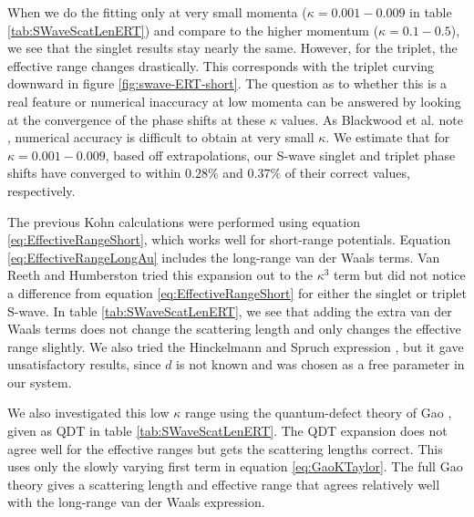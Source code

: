 \documentclass[preprint,showpacs,preprintnumbers,amsmath,amssymb]{revtex4}
\begin{document}
When we do the fitting only at very small momenta ($\kappa = 0.001 - 0.009$ in table \ref{tab:SWaveScatLenERT}) and compare to the higher momentum ($\kappa = 0.1 - 0.5$), we see that the singlet results stay nearly the same. However, for the triplet, the effective range changes drastically. This corresponds with the triplet curving downward in figure \ref{fig:swave-ERT-short}. The question as to whether this is a real feature or numerical inaccuracy at low momenta can be answered by looking at the convergence of the phase shifts at these $\kappa$ values. As Blackwood et al. note \cite{Blackwood2002}, numerical accuracy is difficult to obtain at very small $\kappa$. We estimate that for $\kappa = 0.001 - 0.009$, based off extrapolations, our S-wave singlet and triplet phase shifts have converged to within $0.28\%$ and $0.37\%$ of their correct values, respectively.

The previous Kohn calculations \cite{VanReeth2003} were performed using equation \ref{eq:EffectiveRangeShort}, which works well for short-range potentials. Equation \ref{eq:EffectiveRangeLongAu} includes the long-range van der Waals terms. Van Reeth and Humberston \cite{VanReeth2003} tried this expansion out to the $\kappa^3$ term but did not notice a difference from equation \ref{eq:EffectiveRangeShort} for either the singlet or triplet S-wave. In table \ref{tab:SWaveScatLenERT}, we see that adding the extra van der Waals terms does not change the scattering length and only changes the effective range slightly. We also tried the Hinckelmann and Spruch expression \cite{Hinckelmann1971}, but it gave unsatisfactory results, since $d$ is not known and was chosen as a free parameter in our system.

We also investigated this low $\kappa$ range using the quantum-defect theory of Gao \cite{Gao1998}, given as QDT in table \ref{tab:SWaveScatLenERT}. The QDT expansion does not agree well for the effective ranges but gets the scattering lengths correct. This uses only the slowly varying first term in equation \ref{eq:GaoKTaylor}. The full Gao theory gives a scattering length and effective range that agrees relatively well with the long-range van der Waals expression.
\end{document}

